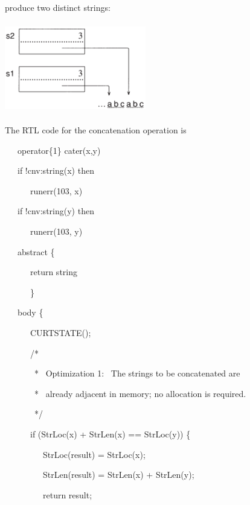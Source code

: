 \noindent produce two distinct strings:

\begin{center}
\includegraphics[width=2.4256in,height=1.572in]{ib-img/ib-img021.png}
\end{center}

The RTL code for the concatenation operation is

{\ttfamily\mdseries
\ \ \ operator\{1\} {\textbar}{\textbar} cater(x,y)}

{\ttfamily\mdseries
\ \ \ if !cnv:string(x) then}

{\ttfamily\mdseries
\ \ \ \ \ \ runerr(103, x)}

{\ttfamily\mdseries
\ \ \ if !cnv:string(y) then}

{\ttfamily\mdseries
\ \ \ \ \ \ runerr(103, y)}


\bigskip

{\ttfamily\mdseries
\ \ \ abstract \{}

{\ttfamily\mdseries
\ \ \ \ \ \ return string}

{\ttfamily\mdseries
\ \ \ \ \ \ \}}

{\ttfamily\mdseries
\ \ \ body \{}

{\ttfamily\mdseries
\ \ \ \ \ \ CURTSTATE();}


\bigskip

{\ttfamily\mdseries
\ \ \ \ \ \ /*}

{\ttfamily\mdseries
\ \ \ \ \ \ \ * \ Optimization 1: \ The strings to be concatenated are}

{\ttfamily\mdseries
\ \ \ \ \ \ \ * \ already adjacent in memory; no allocation is required.}

{\ttfamily\mdseries
\ \ \ \ \ \ \ */}

{\ttfamily\mdseries
\ \ \ \ \ \ if (StrLoc(x) + StrLen(x) == StrLoc(y)) \{}

{\ttfamily\mdseries
\ \ \ \ \ \ \ \ \ StrLoc(result) = StrLoc(x);}

{\ttfamily\mdseries
\ \ \ \ \ \ \ \ \ StrLen(result) = StrLen(x) + StrLen(y);}

{\ttfamily\mdseries
\ \ \ \ \ \ \ \ \ return result;}

